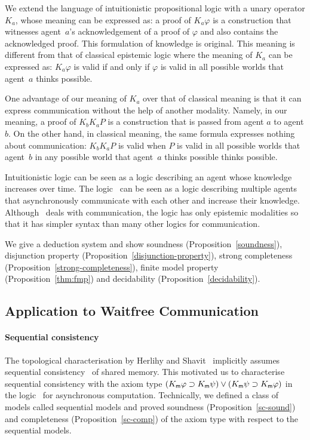     We extend the language of intuitionistic propositional logic with a unary operator $K_a$,
    whose meaning can be expressed as:
    a proof of $K_a\varphi$ is a construction that witnesses agent~$a$'s
    acknowledgement of a proof of $\varphi$ and also contains the acknowledged
    proof.  This formulation of knowledge is original.
    This meaning is different from that of classical epistemic logic where
    the meaning of $K_a$ can be expressed as:
    $K_a\varphi$ is valid if and only if $\varphi$ is valid in all possible worlds
    that agent~$a$ thinks possible.

    One advantage of our meaning of $K_a$ over that of classical meaning is that
    it can express communication without the help of another modality.
    Namely, in our meaning,
    a proof of $K_bK_a P$ is a construction that is passed from agent $a$ to agent
    $b$.
    On the other hand, in classical meaning, the same formula expresses nothing about
    communication:
    $K_b K_a P$ is valid when $P$ is valid in all possible worlds that agent~$b$ in any
    possible world that agent~$a$ thinks possible thinks possible.

    Intuitionistic logic can be seen as a logic describing an agent whose knowledge increases over
    time.
    The logic \iec\,  can be seen as a logic describing multiple agents
    that asynchronously communicate with each other and increase their knowledge.
    Although \iec\, deals with communication, the logic has only epistemic modalities so that it
    has simpler syntax than many other logics for communication.

    We give a deduction system and show
    soundness (Proposition~\ref{soundness}),
    disjunction property (Proposition~\ref{disjunction-property}),
    strong completeness
    (Proposition~\ref{strong-completeness}), finite model property
    (Proposition~\ref{thm:fmp}) and decidability (Proposition~\ref{decidability}).

  \subsection{Application to Waitfree Communication}

    \paragraph{Sequential consistency}
    The topological characterisation by Herlihy and Shavit~\cite{herlihy1999topological}
    implicitly assumes sequential consistency~\cite{lamport1979make} of shared memory.
    This motivated us to characterise sequential consistency with the axiom type
    $(K_{\sf m} \varphi\supset K_{\sf m} \psi)\vee (K_{\sf m}
       \psi\supset K_{\sf m} \varphi)$
       in the logic \iec\, for asynchronous computation.
       Technically, we defined a class of models called sequential models
       and proved soundness
       (Proposition~\ref{sc-sound}) and completeness
       (Proposition~\ref{sc-comp}) of the axiom type with respect to the sequential models.

